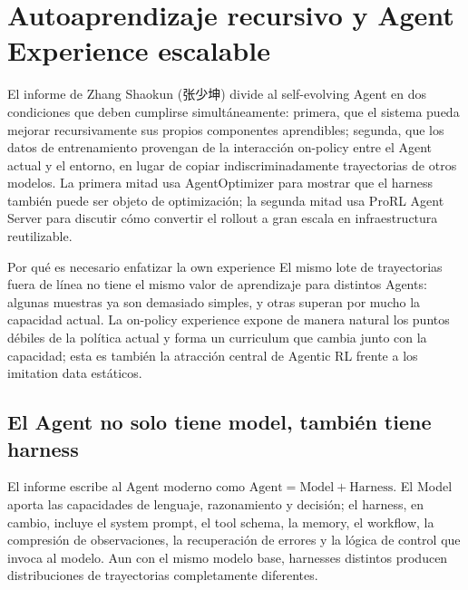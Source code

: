 \section{Autoaprendizaje recursivo y Agent Experience escalable}

El informe de Zhang Shaokun (张少坤) divide al self-evolving Agent en dos condiciones que deben cumplirse simultáneamente: primera, que el sistema pueda mejorar recursivamente sus propios componentes aprendibles; segunda, que los datos de entrenamiento provengan de la interacción on-policy entre el Agent actual y el entorno, en lugar de copiar indiscriminadamente trayectorias de otros modelos. La primera mitad usa AgentOptimizer para mostrar que el harness también puede ser objeto de optimización; la segunda mitad usa ProRL Agent Server para discutir cómo convertir el rollout a gran escala en infraestructura reutilizable.


\begin{importantbox}{Por qué es necesario enfatizar la own experience}
El mismo lote de trayectorias fuera de línea no tiene el mismo valor de aprendizaje para distintos Agents: algunas muestras ya son demasiado simples, y otras superan por mucho la capacidad actual. La on-policy experience expone de manera natural los puntos débiles de la política actual y forma un curriculum que cambia junto con la capacidad; esta es también la atracción central de Agentic RL frente a los imitation data estáticos.
\end{importantbox}

\subsection{El Agent no solo tiene model, también tiene harness}

El informe escribe al Agent moderno como $\text{Agent}=\text{Model}+\text{Harness}$. El Model aporta las capacidades de lenguaje, razonamiento y decisión; el harness, en cambio, incluye el system prompt, el tool schema, la memory, el workflow, la compresión de observaciones, la recuperación de errores y la lógica de control que invoca al modelo. Aun con el mismo modelo base, harnesses distintos producen distribuciones de trayectorias completamente diferentes.


